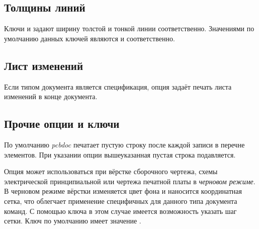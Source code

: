 \subsection{Толщины линий}

Ключи  и  задают ширину толстой и
тонкой линии соответственно. Значениями по умолчанию данных ключей являются
\bfsf{0.6mm} и \bfsf{0.3mm} соответственно.

\subsection{Лист изменений}

Если типом документа является спецификация, опция  задаёт
печать листа изменений в конце документа.

\subsection{Прочие опции и ключи}

По умолчанию \emph{pcbdoc} печатает пустую строку после каждой записи в перечне
элементов. При указании опции  вышеуказанная пустая строка
подавляется.

Опция  может использоваться при вёрстке сборочного чертежа, схемы
электрической принципиальной или чертежа печатной платы в \emph{черновом режиме}. В
черновом режиме вёрстки изменяется цвет фона и наносится координатная сетка, что
облегчает применение специфичных для данного типа документа команд. С помощью ключа
 в этом случае имеется возможность указать шаг сетки. Ключ
 по умолчанию имеет значение \bfsf{10mm}.

